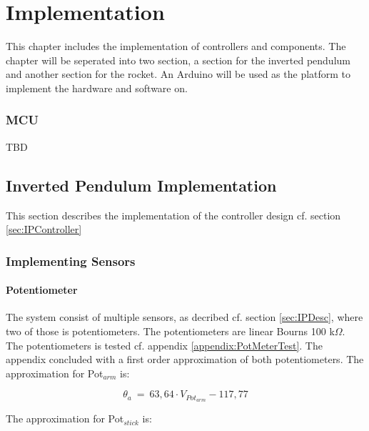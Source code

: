 \chapter{Implementation}
This chapter includes the implementation of controllers and components. The chapter will be seperated into two section, a section for the inverted pendulum and another section for the rocket. An Arduino will be used as the platform to implement the hardware and software on.    


\subsection{MCU}\label{sec:MCU}
TBD


\section{Inverted Pendulum Implementation}
This section describes the implementation of the controller design cf. section \ref{sec:IPController}

\subsection{Implementing Sensors}


\subsubsection*{Potentiometer}\label{section:PotmeterImplementation}
The system consist of multiple sensors, as decribed cf. section \ref{sec:IPDesc}, where two of those is potentiometers. The potentiometers are linear Bourns 100 k$\Omega$. The potentiometers is tested cf. appendix \ref{appendix:PotMeterTest}. The appendix concluded with a first order approximation of both potentiometers. The approximation for Pot$_{arm}$ is:

\begin{equation}
\theta_a\ =\ 63,64 \cdot V_{{Pot}_{arm}} - 117,77
\end{equation}
\startexplain
\stopexplain

The approximation for Pot$_{stick}$ is:

